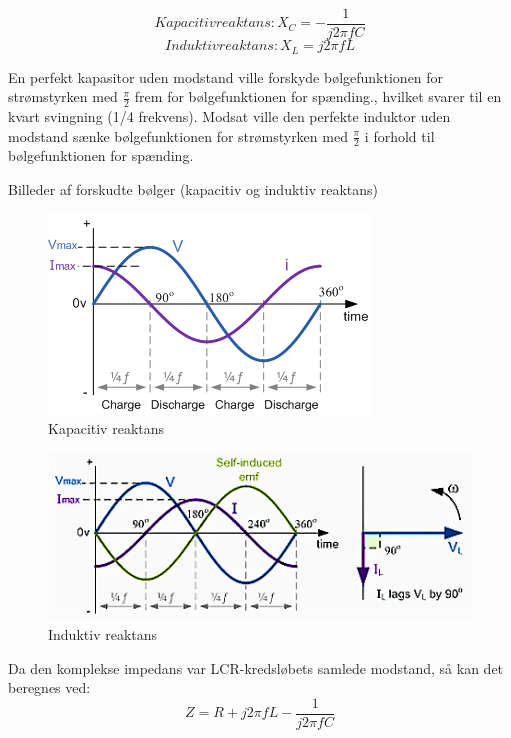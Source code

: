 \begin{equation} 
Kapacitiv reaktans: X_C = - \frac{1}{j 2 \pi f C}
\end{equation}
\begin{equation}
Induktiv reaktans: X_L = j 2 \pi f L
\end{equation}

En perfekt kapasitor uden modstand ville forskyde bølgefunktionen for strømstyrken med $\frac{\pi}{2}$ frem for bølgefunktionen for spænding., hvilket svarer til en kvart svingning (1/4 frekvens). Modsat ville den perfekte induktor uden modstand sænke bølgefunktionen for strømstyrken med $\frac{\pi}{2}$ i forhold til bølgefunktionen for spænding.

Billeder af forskudte bølger (kapacitiv og induktiv reaktans)
\begin{figure}[H]
\centering
\includegraphics[scale=1]{Vildledning/Schematics/Kapacitiv_reaktans}
\caption{Kapacitiv reaktans}
\label{kreaktans}
\end{figure}

\begin{figure}[H]
\centering
\includegraphics[scale=0.8]{Vildledning/Schematics/Induktiv_reaktans}
\caption{Induktiv reaktans}
\label{ireaktans}
\end{figure}

Da den komplekse impedans var LCR-kredsløbets samlede modstand, så kan det beregnes ved: \cite{impedans}
\begin{equation}
Z = R + j 2 \pi f L - \frac{1}{j 2 \pi f C}
\end{equation}
\newpage